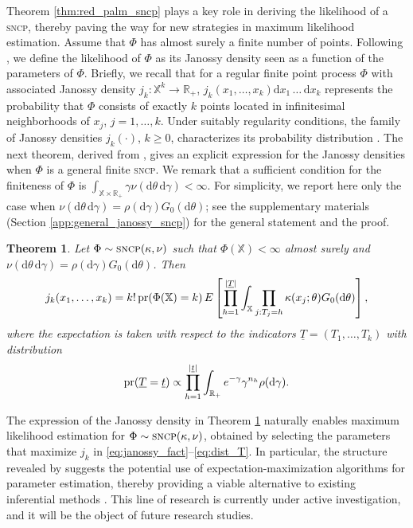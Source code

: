 \documentclass[11pt,a4paper,oneside]{article}
\newcommand{\dd}{\mathrm d}
\newcommand{\E}{E}
\newcommand{\X}{\mathbb{X}}
\newcommand{\R}{\mathbb{R}}
\newcommand{\prob}{{\rm pr}}
\newtheorem{theorem}{Theorem}
\theoremstyle{definition}
\theoremstyle{remark}
\begin{document}
Theorem \ref{thm:red_palm_sncp} plays a key role in deriving the likelihood of a \textsc{sncp}, thereby paving the way for new strategies in maximum likelihood estimation. Assume that $\Phi$ has almost surely a finite number of points.
Following \cite{DaVeJo1}, we define the likelihood of $\Phi$ as its Janossy density seen as a function of the parameters of $\Phi$.
Briefly, we recall that for a regular finite point process $\Phi$ with associated Janossy density $j_k: \X^k \to \R_+$, $j_k(x_1, \ldots, x_k) \dd x_1 \,\ldots\, \dd x_k$ represents the probability that $\Phi$ consists of exactly $k$ points located in infinitesimal neighborhoods of $x_j$, $j=1, \ldots, k$. Under suitably regularity conditions, the family of Janossy densities $j_k(\cdot)$, $k\geq 0$, characterizes its probability distribution \citep[Proposition 5.3.II,][]{DaVeJo1}.
The next theorem, derived from , gives an explicit expression for the Janossy densities when $\Phi$ is a general finite \textsc{sncp}. We remark that a sufficient condition for the finiteness of $\Phi$ is $\int_{\X\times \R_+} \gamma \nu(\dd \theta\,\dd \gamma) < \infty$. For simplicity, we report here only the case when $\nu(\dd \theta \, \dd \gamma) = \rho(\dd \gamma) G_0(\dd \theta)$; see the supplementary materials (Section \ref{app:general_janossy_sncp}) for the general statement and the proof.
\begin{theorem}\label{thm:janossy_sncp}
    Let $\Phi \sim \textsc{sncp}(\kappa, \nu)$ such that $\Phi(\X) < \infty$ almost surely and $\nu(\dd \theta \, \dd \gamma) = \rho(\dd \gamma) G_0(\dd \theta)$. Then 
\begin{equation}\label{eq:janossy_fact}
    j_k(x_1,\ldots,x_k) = k! \, \prob( \Phi(\X) = k) \,\E\left[\prod_{h=1}^{|\underline{T}|} \int_{\X}\prod_{j: T_j = h} \kappa(x_j ; \theta) G_0(\dd \theta)\right],
\end{equation}
where the expectation is taken with respect to the indicators $\underline{T} = (T_1, \ldots, T_k)$ with distribution
\begin{equation}\label{eq:dist_T}
\prob(\underline{T} = \underline{t}) \propto  \prod_{h=1}^{|\underline{t}|} \int_{\R_+} e^{-\gamma} \gamma^{n_h} \rho(\dd \gamma) .    
\end{equation}
\end{theorem}
The expression of the Janossy density in Theorem \ref{thm:janossy_sncp} naturally enables maximum likelihood estimation for $\Phi \sim \textsc{sncp}(\kappa, \nu)$, obtained by selecting the parameters that maximize $j_k$ in \eqref{eq:janossy_fact}--\eqref{eq:dist_T}.
In particular, the structure revealed by  suggests the potential use of expectation-maximization algorithms for parameter estimation, thereby providing a viable alternative to existing inferential methods \citep{MoWaBook03}. This line of research is currently under active investigation, and it will be the object of future research studies.
\end{document}
